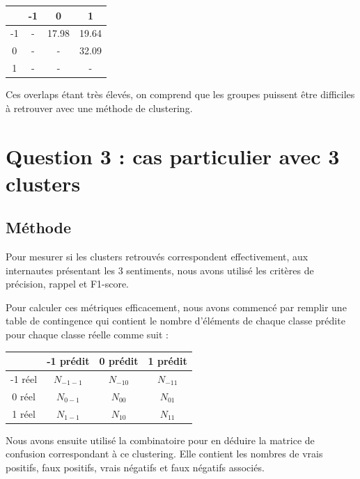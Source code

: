 \documentclass{article}
\begin{document}
\begin{center}
\begin{tabular}{|c|c|c|c|}
\hline
& -1 & 0 & 1 \\
\hline
-1 & - & 17.98 & 19.64 \\
\hline
0 & - & - & 32.09 \\
\hline
1 & - & - & - \\
\hline
\end{tabular}
\end{center}

Ces overlaps étant très élevés, on comprend que les groupes puissent être
difficiles à retrouver avec une méthode de clustering.

\newpage

\section*{Question 3 : cas particulier avec 3 clusters}

\subsection*{Méthode}

Pour mesurer si les clusters retrouvés correspondent effectivement,
aux internautes présentant les 3 sentiments, nous avons utilisé les critères
de précision, rappel et F1-score.

Pour calculer ces métriques efficacement, nous avons commencé par remplir
une table de contingence qui contient le nombre d'éléments de chaque classe
prédite pour chaque classe réelle comme suit :\\

\begin{center}
\begin{tabular}{|c|c|c|c|}
\hline
& -1 prédit & 0 prédit & 1 prédit \\
\hline
-1 réel & $N_{-1-1}$ & $N_{-10}$ & $N_{-11}$ \\
\hline
0 réel & $N_{0-1}$ & $N_{00}$ & $N_{01}$ \\
\hline
1 réel & $N_{1-1}$ & $N_{10}$ & $N_{11}$ \\
\hline
\end{tabular}
\end{center}

Nous avons ensuite utilisé la combinatoire pour en déduire la matrice de
confusion correspondant à ce clustering. Elle contient les nombres de vrais positifs,
faux positifs, vrais négatifs et faux négatifs associés. 
\end{document}
